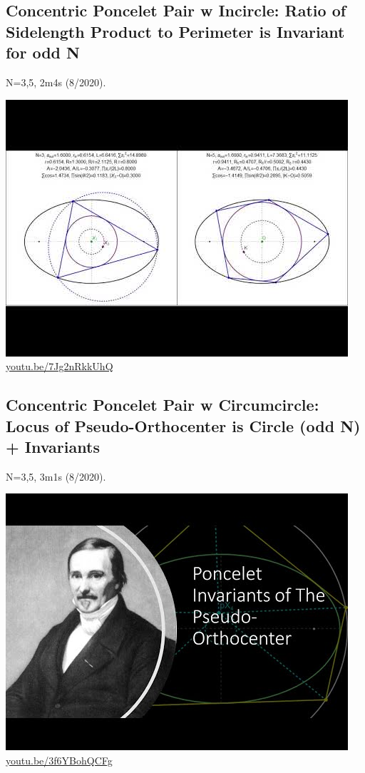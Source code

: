 \documentclass[12pt]{amsart}
\begin{document}
\subsection{Concentric Poncelet Pair w Incircle: Ratio of Sidelength Product to Perimeter is Invariant for odd N}
\label{vid:7Jg2nRkkUhQ}
\noindent N=3,5, 2m4s (8/2020). 
\begin{center}\includegraphics[width=.5\textwidth]{pics/7Jg2nRkkUhQ.jpg} \\ 
\href{https://youtu.be/7Jg2nRkkUhQ}{\url{youtu.be/7Jg2nRkkUhQ}}\end{center}
% 
\subsection{Concentric Poncelet Pair w Circumcircle: Locus of Pseudo-Orthocenter is Circle (odd N) + Invariants}
\label{vid:3f6YBohQCFg}
\noindent N=3,5, 3m1s (8/2020). 
\begin{center}\includegraphics[width=.5\textwidth]{pics/3f6YBohQCFg.jpg} \\ 
\href{https://youtu.be/3f6YBohQCFg}{\url{youtu.be/3f6YBohQCFg}}\end{center}
% 
\end{document}
